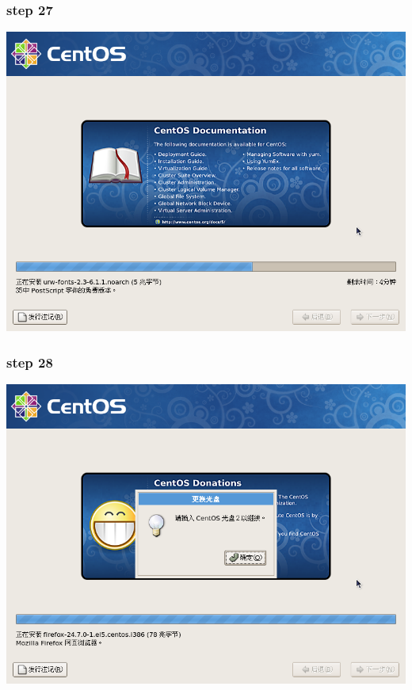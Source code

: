 \documentclass[xcolor=svgnames,presentation]{beamer}
\begin{document}
\begin{frame}
\frametitle{step 27}
\label{sec-2-27}

\begin{center}
\includegraphics[width=.9\linewidth]{img/img41.png}
\end{center}
\end{frame}
\begin{frame}
\frametitle{step 28}
\label{sec-2-28}

\begin{center}
\includegraphics[width=.9\linewidth]{img/img42.png}
\end{center}
\end{frame}
\end{document}
